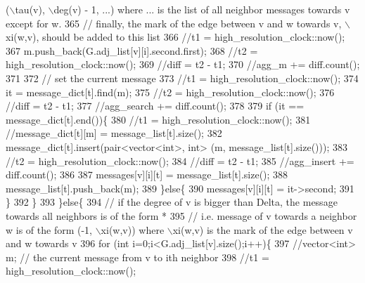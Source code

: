 \begin{DoxyCode}
{       (\(\backslash\)tau(v), \(\backslash\)deg(v) - 1, ...) where ... is the list of all neighbor messages towards v except for w. }
365 \textcolor{comment}{          // finally, the mark of the edge between v and w towards v, \(\backslash\)xi(w,v), should be added to this
       list}
366 \textcolor{comment}{          //t1 = high\_resolution\_clock::now();}
367 \textcolor{comment}{          m.push\_back(G.adj\_list[v][i].second.first);}
368 \textcolor{comment}{          //t2 = high\_resolution\_clock::now();}
369 \textcolor{comment}{          //diff = t2 - t1;}
370 \textcolor{comment}{          //agg\_m += diff.count();}
371 \textcolor{comment}{}
372 \textcolor{comment}{          // set the current message}
373 \textcolor{comment}{          //t1 = high\_resolution\_clock::now();}
374 \textcolor{comment}{          it = message\_dict[t].find(m);}
375 \textcolor{comment}{          //t2 = high\_resolution\_clock::now();}
376 \textcolor{comment}{          //diff = t2 - t1;}
377 \textcolor{comment}{          //agg\_search += diff.count();}
378 \textcolor{comment}{}
379 \textcolor{comment}{          if (it == message\_dict[t].end())\{}
380 \textcolor{comment}{            //t1 = high\_resolution\_clock::now();}
381 \textcolor{comment}{            //message\_dict[t][m] = message\_list[t].size();}
382 \textcolor{comment}{            message\_dict[t].insert(pair<vector<int>, int> (m, message\_list[t].size()));}
383 \textcolor{comment}{            //t2 = high\_resolution\_clock::now();}
384 \textcolor{comment}{            //diff = t2 - t1;}
385 \textcolor{comment}{            //agg\_insert += diff.count();}
386 \textcolor{comment}{}
387 \textcolor{comment}{            messages[v][i][t] = message\_list[t].size();}
388 \textcolor{comment}{            message\_list[t].push\_back(m);}
389 \textcolor{comment}{          \}else\{}
390 \textcolor{comment}{            messages[v][i][t] = it->second;}
391 \textcolor{comment}{          \}}
392 \textcolor{comment}{        \}}
393 \textcolor{comment}{      \}else\{}
394 \textcolor{comment}{        // if the degree of v is bigger than Delta, the message towards all neighbors is of the form *}
395 \textcolor{comment}{        // i.e. message of v towards a neighbor w is of the form (-1, \(\backslash\)xi(w,v)) where \(\backslash\)xi(w,v) is the mark
       of the edge between v and w towards v}
396 \textcolor{comment}{        for (int i=0;i<G.adj\_list[v].size();i++)\{}
397 \textcolor{comment}{          //vector<int> m; // the current message from v to ith neighbor}
398 \textcolor{comment}{          //t1 = high\_resolution\_clock::now();}

\end{DoxyCode}
